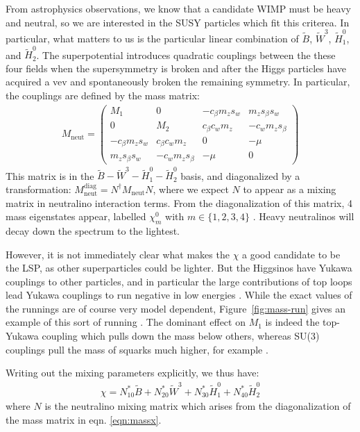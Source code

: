 From astrophysics observations, we know that a candidate WIMP must be heavy and neutral, so we are interested in the SUSY particles which fit this criterea. In particular, what matters to us is the particular linear combination of $\tilde{B}$, $\tilde{W}^3$, $\tilde{H}_1^0$, and $\tilde{H}_2^0$. The superpotential introduces quadratic couplings between the these four fields when the supersymmetry is broken and after the Higgs particles have acquired a vev and spontaneously broken the remaining symmetry. In particular, the couplings are defined by the mass matrix:
\begin{align}
  M_\mathrm{neut}=
\left(
\begin{array}{cccc}
 M_1 & 0 & -c_{\beta } m_z s_w &
   m_z s_{\beta } s_w \\
 0 & M_2 & c_{\beta } c_w m_z &
   -c_w m_z s_{\beta } \\
 -c_{\beta } m_z s_w & c_{\beta }
   c_w m_z & 0 & -\mu  \\
 m_z s_{\beta } s_w & -c_w m_z
   s_{\beta } & -\mu  & 0
\end{array}
\right)  \label{eqn:massx}
\end{align}
This matrix is in the $\tilde{B}-\tilde{W}^3-\tilde{H}_1^0-\tilde{H}_2^0$ basis, and diagonalized by a transformation: $M_\mathrm{neut}^\mathrm{diag} = N^\dagger M_\mathrm{neut} N$, where we expect $N$ to appear as a mixing matrix in neutralino interaction terms. From the diagonalization of this matrix, 4 mass eigenstates appear, labelled $\chi_m^0$ with $m\in\{1,2,3,4\}$ \cite[p.~349]{Jungman}. Heavy neutralinos will decay down the spectrum to the lightest.

However, it is not immediately clear what makes the $\chi$ a good candidate to be the LSP, as other superparticles could be lighter.  But the Higgsinos have Yukawa couplings to other particles, and in particular the large contributions of top loops lead Yukawa couplings to run negative in low energies \cite[p.~80]{Martin1997}. While the exact values of the runnings are of course very model dependent, Figure~\ref{fig:mass-run} gives an example of this sort of running \cite[p.~80]{Martin1997}. The dominant effect on $M_1$ is indeed the top-Yukawa coupling which pulls down the mass below others, whereas SU(3) couplings pull the mass of squarks much higher, for example \cite[p.~81]{Martin1997}.



Writing out the mixing parameters explicitly, we thus have:
\begin{align}
  \chi = N_{10}^* \tilde{B} + N_{20}^* \tilde{W}^3 + N_{30}^* \tilde{H}_1^0 + N_{40}^* \tilde{H}_2^0
\end{align}
where $N$ is the neutralino mixing matrix which arises from the diagonalization of the mass matrix in eqn. \ref{eqn:massx}. 

